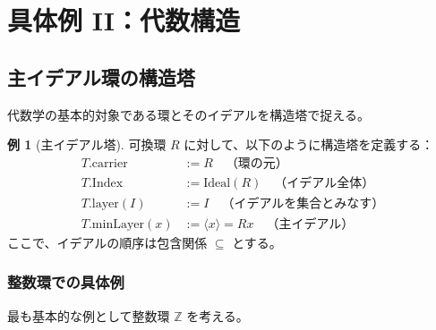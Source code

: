 \documentclass[a4paper,11pt,ja=standard]{bxjsarticle}
\theoremstyle{definition}
\newtheorem{example}[definition]{例}
\begin{document}
\section{具体例 II：代数構造}

\subsection{主イデアル環の構造塔}

代数学の基本的対象である環とそのイデアルを構造塔で捉える。

\begin{example}[主イデアル塔]
可換環 $R$ に対して、以下のように構造塔を定義する：
\begin{align*}
T.\text{carrier} &:= R \quad \text{（環の元）} \\
T.\text{Index} &:= \text{Ideal}(R) \quad \text{（イデアル全体）} \\
T.\text{layer}(I) &:= I \quad \text{（イデアルを集合とみなす）} \\
T.\text{minLayer}(x) &:= \langle x \rangle = Rx \quad \text{（主イデアル）}
\end{align*}
ここで、イデアルの順序は包含関係 $\subseteq$ とする。
\end{example}

\subsubsection{整数環での具体例}

最も基本的な例として整数環 $\mathbb{Z}$ を考える。
\end{document}
